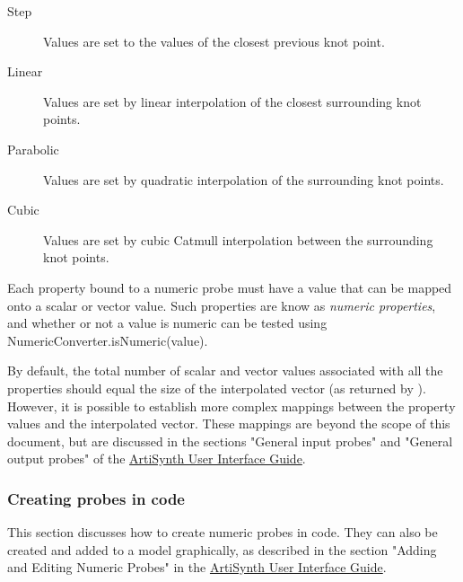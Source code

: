 \begin{description}

\item[Step]\mbox{}

Values are set to the values of the closest previous knot point.

\item[Linear]\mbox{}

Values are set by linear interpolation of the closest surrounding knot
points.

\item[Parabolic]\mbox{}

Values are set by quadratic interpolation of the surrounding knot
points.

\item[Cubic]

Values are set by cubic Catmull interpolation between the surrounding
knot points.

\end{description}

Each property bound to a numeric probe must have a value
that can be mapped onto a scalar or vector value. Such properties
are know as {\it numeric properties}, and whether or not
a value is numeric can be tested
using %
{NumericConverter.isNumeric(value)}.

By default, the total number of scalar and vector values associated
with all the properties should equal the size of the interpolated
vector (as returned by
).
However, it is possible to establish more complex mappings between the
property values and the interpolated vector. These mappings are beyond
the scope of this document, but are discussed in the sections "General
input probes" and "General output probes" of the
\href{http://www.artisynth.org/doc/html/uiguide/uiguide.html}{
ArtiSynth User Interface Guide}.

\subsubsection{Creating probes in code}

This section discusses how to create numeric probes in code.  They can
also be created and added to a model graphically, as described in the
section "Adding and Editing Numeric Probes" in the
\href{http://www.artisynth.org/doc/html/uiguide/uiguide.html}{
ArtiSynth User Interface Guide}.

